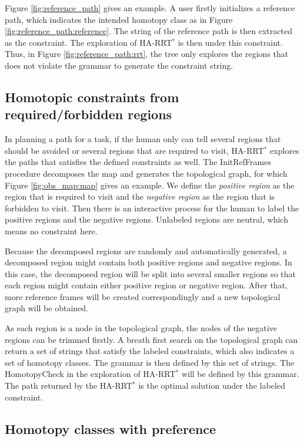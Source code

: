 \documentclass[letterpaper, 10 pt, conference]{ieeeconf}
\begin{document}
Figure \ref{fig:reference_path} gives an example.
A user firstly initializes a reference path, which indicates the intended homotopy class as in Figure \ref{fig:reference_path:reference}.
The string of the reference path is then extracted as the constraint.
The exploration of HA-RRT$^{*}$ is then under this constraint.
Thus, in Figure \ref{fig:reference_path:rrt}, the tree only explores the regions that does not violate the grammar to generate the constraint string.

\subsection{Homotopic constraints from required/forbidden regions}

In planning a path for a task, if the human only can tell several regions that should be avoided or several regions that are required to visit, HA-RRT$^{*}$ explores the paths that satisfies the defined constraints as well.
The {\sc InitRefFrames} procedure decomposes the map and generates the topological graph, for which Figure \ref{fig:obs_map:map} gives an example.
We define the \emph{positive region} as the region that is required to visit and the \emph{negative region} as the region that is forbidden to visit.
Then there is an interactive process for the human to label the positive regions and the negative regions.
Unlabeled regions are neutral, which means no constraint here.

Because the decomposed regions are randomly and automatically generated, a decomposed region might contain both positive regions and negative regions.
In this case, the decomposed region will be split into several smaller regions so that each region might contain either positive region or negative region.
After that, more reference frames will be created correspondingly and a new topological graph will be obtained.

As each region is a node in the topological graph, the nodes of the negative regions can be trimmed firstly.
A breath first search on the topological graph can return a set of strings that satisfy the labeled constraints, which also indicates a set of homotopy classes.
The grammar is then defined by this set of strings.
The {\sc HomotopyCheck} in the exploration of HA-RRT$^{*}$ will be defined by this grammar.
The path returned by the HA-RRT$^{*}$ is the optimal solution under the labeled constraint.

\subsection{Homotopy classes with preference}
\end{document}
